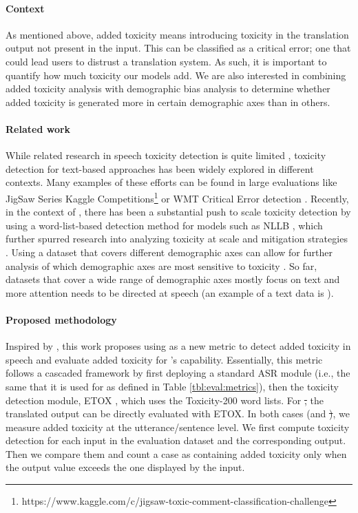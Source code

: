 \paragraph{Context} As mentioned above, added toxicity means introducing toxicity in the translation output not present in the input. This can be classified as a critical error; one that could lead users to distrust a translation system. As such, it is important to quantify how much toxicity our models add. We are also interested in combining added toxicity analysis with demographic bias analysis to determine whether added toxicity is generated more in certain demographic axes than in others.

\paragraph{Related work} While related research in speech toxicity detection is quite limited \citep{10.1007/978-3-030-60276-5_19,DBLP:conf/eusipco/YousefiE21}, toxicity detection for text-based approaches has been widely explored in different contexts. Many examples of these efforts can be found in large evaluations like JigSaw Series Kaggle Competitions\footnote{https://www.kaggle.com/c/jigsaw-toxic-comment-classification-challenge} or WMT Critical Error detection \citep{specia-etal-2021-findings}. Recently, in the context of \mt, there has been a substantial push to scale toxicity detection by using a word-list-based detection method for models such as NLLB \citep{nllb2022}, which further spurred research into analyzing toxicity at scale \citep{costajussa2023toxicity} and mitigation strategies \citep{gilabert2023resetox}.  %
Using a dataset that covers different demographic axes can allow for further analysis of which demographic axes are most sensitive to toxicity \citep{costajussa2023toxicity}. So far, datasets that cover a wide range of demographic axes mostly focus on text and more attention needs to be directed at speech (an example of a text data is \holisticbias \citep{smith-etal-2022-im}).



\paragraph{Proposed methodology} 

Inspired by \asrbleu, this work proposes using \asretox as a new metric to detect added toxicity in speech and evaluate added toxicity for \mfourt's \sst capability. Essentially, this metric follows a cascaded framework by first deploying a standard ASR module (i.e., the same that it is used for \asrbleu as defined in Table \ref{tbl:eval:metrics}), then the toxicity detection module, ETOX \citep{costajussa2023toxicity}, which uses the Toxicity-200 word lists. %
For \st, the translated output can be directly evaluated with ETOX. In both cases (\sst and \st), we measure added toxicity at the utterance/sentence level. We first compute toxicity detection for each input in the evaluation dataset and the corresponding output. Then we compare them and count a case as containing added toxicity only when the output value exceeds the one displayed by the input. %





